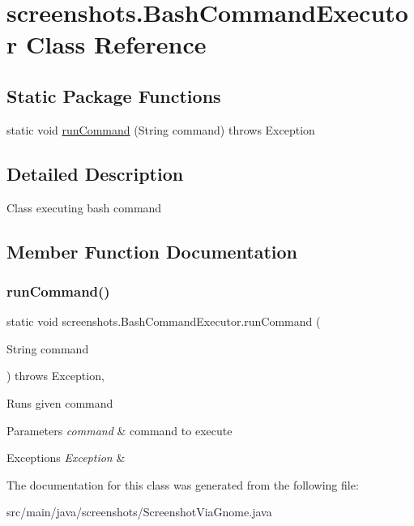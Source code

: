 \hypertarget{classscreenshots_1_1_bash_command_executor}{}\section{screenshots.\+Bash\+Command\+Executor Class Reference}
\label{classscreenshots_1_1_bash_command_executor}
\subsection*{Static Package Functions}
\begin{DoxyCompactItemize}
\item 
static void \hyperlink{classscreenshots_1_1_bash_command_executor_a22b3d008b35543c56041db3122163b90}{run\+Command} (String command)  throws Exception 
\end{DoxyCompactItemize}


\subsection{Detailed Description}
Class executing bash command 

\subsection{Member Function Documentation}
\mbox{\label{classscreenshots_1_1_bash_command_executor_a22b3d008b35543c56041db3122163b90}} 
\subsubsection{\texorpdfstring{run\+Command()}{runCommand()}}
{\footnotesize\ttfamily static void screenshots.\+Bash\+Command\+Executor.\+run\+Command (\begin{DoxyParamCaption}\item[{String}]{command }\end{DoxyParamCaption}) throws Exception\hspace{0.3cm}{\ttfamily [static]}, {\ttfamily [package]}}

Runs given command 
\begin{DoxyParams}{Parameters}
{\em command} & command to execute \\
\hline
\end{DoxyParams}

\begin{DoxyExceptions}{Exceptions}
{\em Exception} & \\
\hline
\end{DoxyExceptions}


The documentation for this class was generated from the following file\+:\begin{DoxyCompactItemize}
\item 
src/main/java/screenshots/Screenshot\+Via\+Gnome.\+java\end{DoxyCompactItemize}
